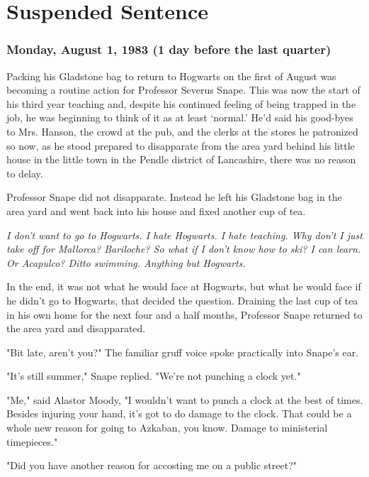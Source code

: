 
\chapter{Suspended Sentence}

\subsection{Monday, August 1, 1983 (1 day before the last quarter)}

Packing his Gladstone bag to return to Hogwarts on the first of August was becoming a routine action for Professor Severus Snape. This was now the start of his third year teaching and, despite his continued feeling of being trapped in the job, he was beginning to think of it as at least `normal.' He'd said his good-byes to Mrs. Hanson, the crowd at the pub, and the clerks at the stores he patronized so now, as he stood prepared to disapparate from the area yard behind his little house in the little town in the Pendle district of Lancashire, there was no reason to delay.

Professor Snape did not disapparate. Instead he left his Gladstone bag in the area yard and went back into his house and fixed another cup of tea.

\emph{I don't want to go to Hogwarts. I hate Hogwarts. I hate teaching. Why don't I just take off for Mallorca? Bariloche? So what if I don't know how to ski? I can learn. Or Acapulco? Ditto swimming. Anything but Hogwarts.}

In the end, it was not what he would face at Hogwarts, but what he would face if he didn't go to Hogwarts, that decided the question. Draining the last cup of tea in his own home for the next four and a half months, Professor Snape returned to the area yard and disapparated.

"Bit late, aren't you?" The familiar gruff voice spoke practically into Snape's ear.

"It's still summer," Snape replied. "We're not punching a clock yet."

"Me," said Alastor Moody, "I wouldn't want to punch a clock at the best of times. Besides injuring your hand, it's got to do damage to the clock. That could be a whole new reason for going to Azkaban, you know. Damage to ministerial timepieces."

"Did you have another reason for accosting me on a public street?"


